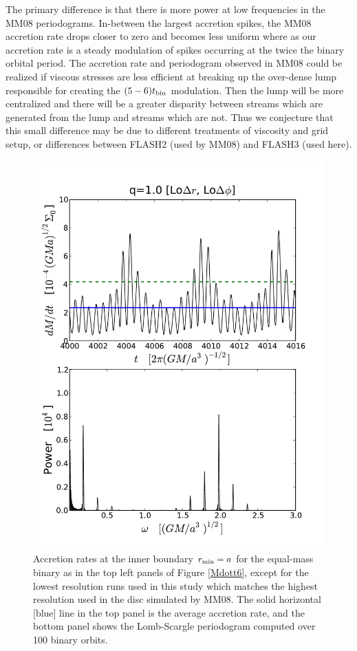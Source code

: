 The primary difference is that there is more power at low frequencies in the MM08 periodograms. In-between the largest accretion spikes, the MM08 accretion rate drops closer to zero and becomes less uniform where as our accretion rate is a steady modulation of spikes occurring at the twice the binary orbital period. The accretion rate and periodogram observed in MM08 could be realized if viscous stresses are less efficient at breaking up the over-dense lump responsible for creating the $(5-6) t_{\rm bin}$ modulation. Then the lump will be more centralized and there will be a greater disparity between streams which are generated from the lump and streams which are not. Thus we conjecture that this small difference may be due to different treatments of viscosity and grid setup, or differences between FLASH2 (used by MM08) and FLASH3 (used here). 


\begin{figure}
\begin{center}
 \includegraphics[scale=0.45]{figures/ch1/Mdot_vs_t_q1_FulVsc_alph01_ResLoLo.pdf}
\end{center}
\caption{Accretion rates at the inner boundary $r_{\rm min}=a$ for the
  equal-mass binary as in the top left panels of Figure \ref{Mdott6},
  except for the lowest resolution runs used in this study which 
  matches the highest resolution used in the disc simulated by MM08.  
  The solid horizontal [blue] line in the top panel is the average 
  accretion rate, and the bottom panel shows
  the Lomb-Scargle periodogram computed over 100 binary orbits.} 
\label{MM08_compare}
\end{figure}




